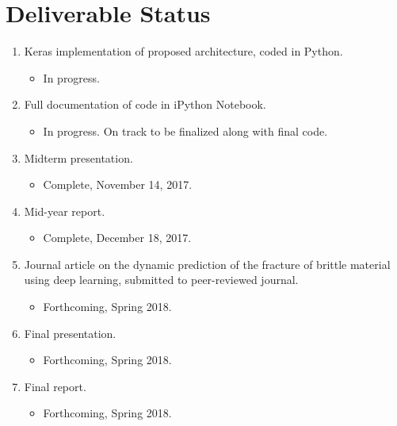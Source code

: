 \section{Deliverable Status}
\begin{enumerate}
\item Keras implementation of proposed architecture, coded in Python.
	\begin{itemize}
		\item In progress.
	\end{itemize} 
\item Full documentation of code in iPython Notebook.
	\begin{itemize}
		\item In progress. On track to be finalized along with final code.
	\end{itemize} 
\item Midterm presentation.
	\begin{itemize}
		\item Complete, November 14, 2017.
	\end{itemize} 
\item Mid-year report.
	\begin{itemize}
		\item Complete, December 18, 2017.
	\end{itemize} 
\item Journal article on the dynamic prediction of the fracture of brittle material using deep learning, submitted to peer-reviewed journal.
	\begin{itemize}
		\item Forthcoming, Spring 2018.
	\end{itemize} 
\item Final presentation.
	\begin{itemize}
		\item Forthcoming, Spring 2018.
	\end{itemize} 
\item Final report.
	\begin{itemize}
		\item Forthcoming, Spring 2018.
	\end{itemize} 
\end{enumerate}